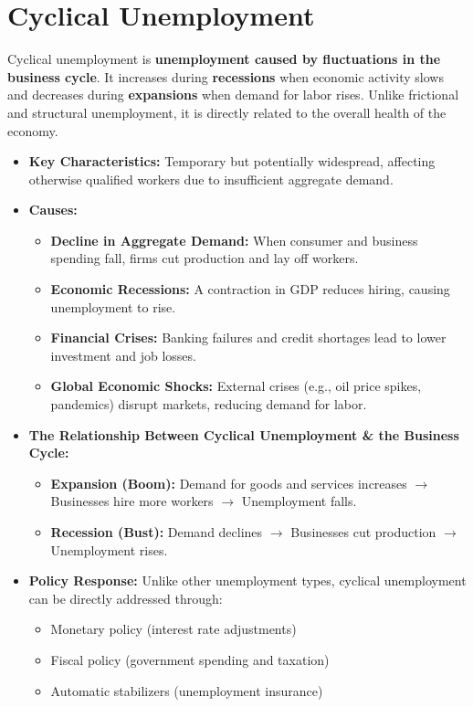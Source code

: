 \documentclass[a4paper, 11pt]{article}
\begin{document}
\section{Cyclical Unemployment}
Cyclical unemployment is \textbf{unemployment caused by fluctuations in the business cycle}. It increases during \textbf{recessions} when economic activity slows and decreases during \textbf{expansions} when demand for labor rises. Unlike frictional and structural unemployment, it is directly related to the overall health of the economy.
\begin{itemize}
    \item \textbf{Key Characteristics:} Temporary but potentially widespread, affecting otherwise qualified workers due to insufficient aggregate demand.
    \item \textbf{Causes:}
    \begin{itemize}
        \item \textbf{Decline in Aggregate Demand:} When consumer and business spending fall, firms cut production and lay off workers.
        \item \textbf{Economic Recessions:} A contraction in GDP reduces hiring, causing unemployment to rise.
        \item \textbf{Financial Crises:} Banking failures and credit shortages lead to lower investment and job losses.
        \item \textbf{Global Economic Shocks:} External crises (e.g., oil price spikes, pandemics) disrupt markets, reducing demand for labor.
    \end{itemize}
    \item \textbf{The Relationship Between Cyclical Unemployment \& the Business Cycle:}
    \begin{itemize}
        \item \textbf{Expansion (Boom):} Demand for goods and services increases $\rightarrow$ Businesses hire more workers $\rightarrow$ Unemployment falls.
        \item \textbf{Recession (Bust):} Demand declines $\rightarrow$ Businesses cut production $\rightarrow$ Unemployment rises.
    \end{itemize}
    \item \textbf{Policy Response:} Unlike other unemployment types, cyclical unemployment can be directly addressed through:
    \begin{itemize}
        \item Monetary policy (interest rate adjustments)
        \item Fiscal policy (government spending and taxation)
        \item Automatic stabilizers (unemployment insurance)
    \end{itemize}
\end{itemize}
\end{document}

